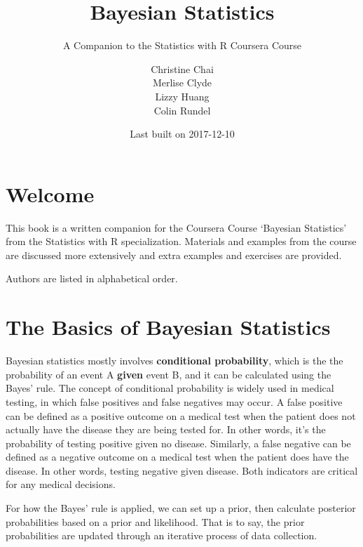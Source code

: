 \documentclass[]{book}
\title{Bayesian Statistics}
\subtitle{A Companion to the Statistics with R Coursera Course}
\author{Christine Chai \\ Merlise Clyde \\ Lizzy Huang \\ Colin Rundel}
\date{Last built on 2017-12-10}
\theoremstyle{definition}
\theoremstyle{definition}
\theoremstyle{definition}
\theoremstyle{remark}
\begin{document}
\maketitle

{
\setcounter{tocdepth}{1}
\tableofcontents
}
\chapter*{Welcome}\label{welcome}

\newcommand{\No}{\textsf{N}}
\newcommand{\Ga}{\textsf{Gamma}}
\newcommand{\St}{\textsf{t}}
\newcommand{\NoGa}{\textsf{NormalGamma}}
\newcommand{\BF}{\textsf{BF}}
\newcommand{\data}{\text{data}}
\newcommand{\iid}{\mathrel{\mathop{\sim}\limits^{\rm iid}}}
\newcommand{\Ca}{\textsf{C}}



This book is a written companion for the Coursera Course `Bayesian
Statistics' from the Statistics with R specialization. Materials and
examples from the course are discussed more extensively and extra
examples and exercises are provided.

Authors are listed in alphabetical order.

\chapter{The Basics of Bayesian
Statistics}\label{the-basics-of-bayesian-statistics}

Bayesian statistics mostly involves \textbf{conditional probability},
which is the the probability of an event A \textbf{given} event B, and
it can be calculated using the Bayes' rule. The concept of conditional
probability is widely used in medical testing, in which false positives
and false negatives may occur. A false positive can be defined as a
positive outcome on a medical test when the patient does not actually
have the disease they are being tested for. In other words, it's the
probability of testing positive given no disease. Similarly, a false
negative can be defined as a negative outcome on a medical test when the
patient does have the disease. In other words, testing negative given
disease. Both indicators are critical for any medical decisions.

For how the Bayes' rule is applied, we can set up a prior, then
calculate posterior probabilities based on a prior and likelihood. That
is to say, the prior probabilities are updated through an iterative
process of data collection.
\end{document}
